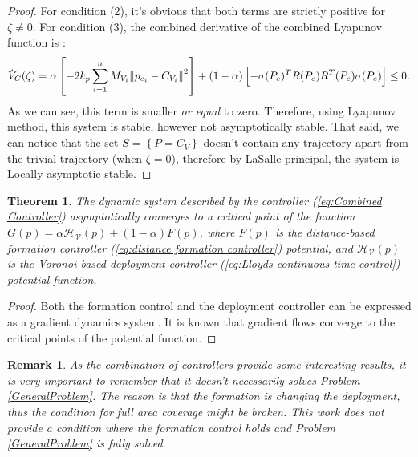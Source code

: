 \documentclass{iacas}
\newtheorem{theorem}{Theorem}
\newtheorem{remark}{Remark}
\begin{document}
\begin{proof}
For condition (2), it's obvious that both terms are strictly positive for $\zeta \neq 0$.
For condition (3), the combined derivative of the combined Lyapunov function is \cite{Cortes2004}:
    \begin{equation}
        \dot{V}_{C}(\zeta) = \alpha \left[ -2k_{p}\sum_{i=1}^{n}M_{V_{i}}\norm{p_{e_{i}} - C_{V_{i}}}^{2} \right] + (1-\alpha)\left[ -\sigma(P_e)^{T}R(P_e)R^{T}(P_e)\sigma(P_e) \right] \leq 0.
    \end{equation}
    As we can see, this term is smaller \emph{or equal} to zero. Therefore, using Lyapunov method, this system is stable, however not asymptotically stable. That said, we can notice that the set $S = \left\{ P = C_{V} \right\}$ doesn't contain any trajectory apart from the trivial trajectory (when $\zeta = 0$), therefore by LaSalle principal, the system is Locally asymptotic stable.
\end{proof}

\begin{theorem}
The dynamic system described by the controller (\ref{eq:Combined Controller}) asymptotically converges to a critical point of the function $G(p) = \alpha \mathcal{H}_{\mathcal{V}}(p) + (1-\alpha) F(p)$, where $F(p)$ is the distance-based formation controller (\ref{eq:distance formation controller})  potential, and $\mathcal{H}_{\mathcal{V}}(p)$ is the Voronoi-based deployment controller (\ref{eq:Lloyds continuous time control}) potential function\cite{Cortes2004}.
    \label{theorem: combined controller stability}
\end{theorem}
\begin{proof}
Both the formation control and the deployment controller can be expressed as a gradient dynamics system. It is
known that gradient flows converge to the critical points of the potential function.
\end{proof}


\begin{remark}As the combination of controllers provide some interesting results, it is very important to remember that it doesn't necessarily solves Problem \ref{GeneralProblem}. The reason is that the formation is changing the deployment, thus the condition for full area coverage might be broken. This work \emph{does not} provide a condition where the formation control holds \emph{and} Problem \ref{GeneralProblem} is fully solved.
\end{remark}
\end{document}

